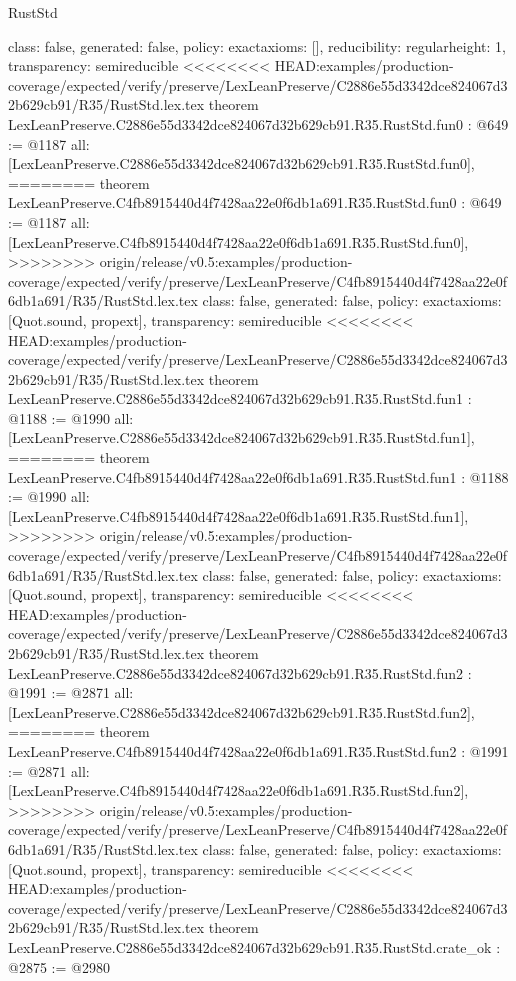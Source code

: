 \begin{lexlean}{RustStd}
\begin{coremodule}
{\begin{coremodule}
{{{  class: false,
  generated: false,
  policy: exact{axioms: []},
  reducibility: regular{height: 1},
  transparency: semireducible
}
<<<<<<<< HEAD:examples/production-coverage/expected/verify/preserve/LexLeanPreserve/C2886e55d3342dce824067d32b629cb91/R35/RustStd.lex.tex
theorem LexLeanPreserve.C2886e55d3342dce824067d32b629cb91.R35.RustStd.fun0 : @649 := @1187 {
  all: [LexLeanPreserve.C2886e55d3342dce824067d32b629cb91.R35.RustStd.fun0],
========
theorem LexLeanPreserve.C4fb8915440d4f7428aa22e0f6db1a691.R35.RustStd.fun0 : @649 := @1187 {
  all: [LexLeanPreserve.C4fb8915440d4f7428aa22e0f6db1a691.R35.RustStd.fun0],
>>>>>>>> origin/release/v0.5:examples/production-coverage/expected/verify/preserve/LexLeanPreserve/C4fb8915440d4f7428aa22e0f6db1a691/R35/RustStd.lex.tex
  class: false,
  generated: false,
  policy: exact{axioms: [Quot.sound, propext]},
  transparency: semireducible
}
<<<<<<<< HEAD:examples/production-coverage/expected/verify/preserve/LexLeanPreserve/C2886e55d3342dce824067d32b629cb91/R35/RustStd.lex.tex
theorem LexLeanPreserve.C2886e55d3342dce824067d32b629cb91.R35.RustStd.fun1 : @1188 := @1990 {
  all: [LexLeanPreserve.C2886e55d3342dce824067d32b629cb91.R35.RustStd.fun1],
========
theorem LexLeanPreserve.C4fb8915440d4f7428aa22e0f6db1a691.R35.RustStd.fun1 : @1188 := @1990 {
  all: [LexLeanPreserve.C4fb8915440d4f7428aa22e0f6db1a691.R35.RustStd.fun1],
>>>>>>>> origin/release/v0.5:examples/production-coverage/expected/verify/preserve/LexLeanPreserve/C4fb8915440d4f7428aa22e0f6db1a691/R35/RustStd.lex.tex
  class: false,
  generated: false,
  policy: exact{axioms: [Quot.sound, propext]},
  transparency: semireducible
}
<<<<<<<< HEAD:examples/production-coverage/expected/verify/preserve/LexLeanPreserve/C2886e55d3342dce824067d32b629cb91/R35/RustStd.lex.tex
theorem LexLeanPreserve.C2886e55d3342dce824067d32b629cb91.R35.RustStd.fun2 : @1991 := @2871 {
  all: [LexLeanPreserve.C2886e55d3342dce824067d32b629cb91.R35.RustStd.fun2],
========
theorem LexLeanPreserve.C4fb8915440d4f7428aa22e0f6db1a691.R35.RustStd.fun2 : @1991 := @2871 {
  all: [LexLeanPreserve.C4fb8915440d4f7428aa22e0f6db1a691.R35.RustStd.fun2],
>>>>>>>> origin/release/v0.5:examples/production-coverage/expected/verify/preserve/LexLeanPreserve/C4fb8915440d4f7428aa22e0f6db1a691/R35/RustStd.lex.tex
  class: false,
  generated: false,
  policy: exact{axioms: [Quot.sound, propext]},
  transparency: semireducible
}
<<<<<<<< HEAD:examples/production-coverage/expected/verify/preserve/LexLeanPreserve/C2886e55d3342dce824067d32b629cb91/R35/RustStd.lex.tex
theorem LexLeanPreserve.C2886e55d3342dce824067d32b629cb91.R35.RustStd.crate_ok : @2875 := @2980 {
}}}}}}
\end{coremodule}}
\end{coremodule}
\end{lexlean}

